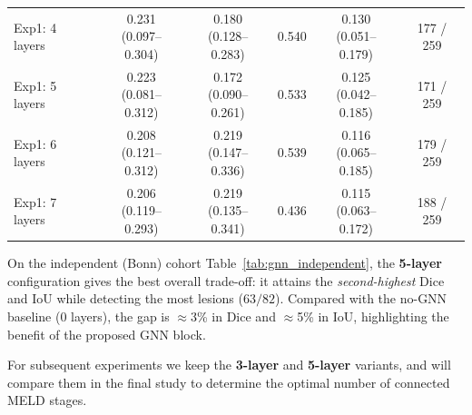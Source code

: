 \documentclass[a4paper,12pt]{article}
\begin{document}
\begin{table}[ht]
\begin{tabular}{lccccc}
Exp1: 4 layers  & \makecell{0.231 \\ (0.097--0.304)} & \makecell{0.180 \\ (0.128--0.283)} & \colorbox{orange!20}{0.540} & \makecell{0.130 \\ (0.051--0.179)} & 177 / 259 \\
Exp1: 5 layers  & \makecell{0.223 \\ (0.081--0.312)} & \makecell{0.172 \\ (0.090--0.261)} & 0.533 & \makecell{0.125 \\ (0.042--0.185)} & 171 / 259 \\
Exp1: 6 layers  & \makecell{0.208 \\ (0.121--0.312)} & \makecell{\colorbox{orange!20}{0.219} \\ (0.147--0.336)} & 0.539 & \makecell{0.116 \\ (0.065--0.185)} & 179 / 259 \\
Exp1: 7 layers  & \makecell{0.206 \\ (0.119--0.293)} & \makecell{\colorbox{orange!20}{0.219} \\ (0.135--0.341)} & 0.436 & \makecell{0.115 \\ (0.063--0.172)} & \colorbox{green!20}{188 / 259} \\
\hline
\end{tabular}
\end{table}


On the independent (Bonn) cohort Table~\ref{tab:gnn_independent}, the \textbf{5-layer} configuration gives the best overall trade-off: it attains the \emph{second-highest} Dice and IoU while detecting the most lesions (\(63/82\)). 
Compared with the no-GNN baseline (0 layers), the gap is \(\approx\)3\% in Dice and \(\approx\)5\% in IoU, highlighting the benefit of the proposed GNN block.

For subsequent experiments we keep the \textbf{3-layer} and \textbf{5-layer} variants, and will compare them in the final study to determine the optimal number of connected MELD stages.
\end{document}
